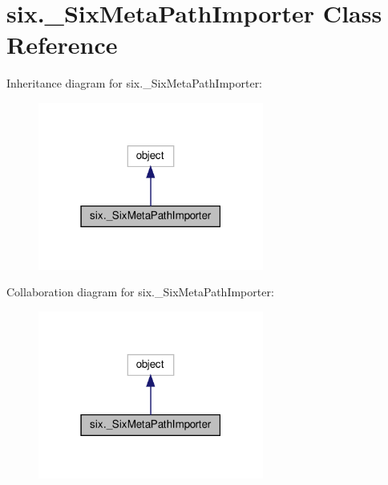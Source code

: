 \hypertarget{classsix_1_1__SixMetaPathImporter}{}\section{six.\+\_\+\+Six\+Meta\+Path\+Importer Class Reference}
\label{classsix_1_1__SixMetaPathImporter}


Inheritance diagram for six.\+\_\+\+Six\+Meta\+Path\+Importer\+:
\nopagebreak
\begin{figure}[H]
\begin{center}
\leavevmode
\includegraphics[width=210pt]{classsix_1_1__SixMetaPathImporter__inherit__graph}
\end{center}
\end{figure}


Collaboration diagram for six.\+\_\+\+Six\+Meta\+Path\+Importer\+:
\nopagebreak
\begin{figure}[H]
\begin{center}
\leavevmode
\includegraphics[width=210pt]{classsix_1_1__SixMetaPathImporter__coll__graph}
\end{center}
\end{figure}
